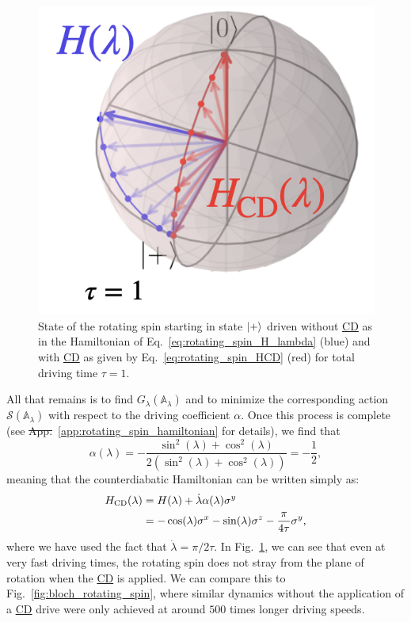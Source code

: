 \documentclass[a4paper,oneside,11pt]{book}
\newcommand{\sx}{\sigma^x}
\newcommand{\sy}{\sigma^y}
\newcommand{\sz}{\sigma^z}
\newcommand{\dotlambda}{\dot{\lambda}}
\newcommand{\approxAGP}{\mathbb{A}_{\lambda}}
\newcommand{\HCD}{H_{\rm CD}}
\newcommand{\acrref}[1]{\hyperref[acr:#1]{#1}}
\providecommand{\DIFaddtex}[1]{{\protect\color{blue}\uwave{#1}}} %
\providecommand{\DIFdeltex}[1]{{\protect\color{red}\sout{#1}}}                      %
\providecommand{\DIFaddbegin}{} %
\providecommand{\DIFaddend}{} %
\providecommand{\DIFdelbegin}{} %
\providecommand{\DIFdelend}{} %
\providecommand{\DIFadd}[1]{\texorpdfstring{\DIFaddtex{#1}}{#1}} %
\providecommand{\DIFdel}[1]{\texorpdfstring{\DIFdeltex{#1}}{}} %
\newcommand{\DIFscaledelfig}{0.5}
\newlength{\DIFdelgraphicswidth} %
\newlength{\DIFdelgraphicsheight} %
\newcommand{\DIFaddincludegraphics}[2][]{{\color{blue}\fbox{\DIFOincludegraphics[#1]{#2}}}} %
\newcommand{\DIFdelincludegraphics}[2][]{%
\sbox{\DIFdelgraphicsbox}{\DIFOincludegraphics[#1]{#2}}%
\settoboxwidth{\DIFdelgraphicswidth}{\DIFdelgraphicsbox} %
\settoboxtotalheight{\DIFdelgraphicsheight}{\DIFdelgraphicsbox} %
\scalebox{\DIFscaledelfig}{%
\parbox[b]{\DIFdelgraphicswidth}{\usebox{\DIFdelgraphicsbox}\\[-\baselineskip] \rule{\DIFdelgraphicswidth}{0em}}\llap{\resizebox{\DIFdelgraphicswidth}{\DIFdelgraphicsheight}{%
\setlength{\unitlength}{\DIFdelgraphicswidth}%
\begin{picture}(1,1)%
\thicklines\linethickness{2pt} %
{\color[rgb]{1,0,0}\put(0,0){\framebox(1,1){}}}%
{\color[rgb]{1,0,0}\put(0,0){\line( 1,1){1}}}%
{\color[rgb]{1,0,0}\put(0,1){\line(1,-1){1}}}%
\end{picture}%
}\hspace*{3pt}}} %
} %
\DeclareRobustCommand{\DIFaddbegin}{\DIFOaddbegin \let\includegraphics\DIFaddincludegraphics} %
\DeclareRobustCommand{\DIFaddend}{\DIFOaddend \let\includegraphics\DIFOincludegraphics} %
\DeclareRobustCommand{\DIFdelbegin}{\DIFOdelbegin \let\includegraphics\DIFdelincludegraphics} %
\DeclareRobustCommand{\DIFdelend}{\DIFOaddend \let\includegraphics\DIFOincludegraphics} %
\begin{document}
    \begin{figure}
    \centering
    \includegraphics[width=0.9\linewidth]{images/rotating_spin_CD.png} \caption[Rotating spin Bloch sphere illustration with counterdiabatic driving]{State of the rotating spin starting in state $\ket{+}$ driven without \acrref{CD} as in the Hamiltonian of Eq.~\eqref{eq:rotating_spin_H_lambda} (blue) and with \acrref{CD} as given by Eq.~\eqref{eq:rotating_spin_HCD} (red) for total driving time $\tau = 1$.}\label{fig:rotating_CD}
    \end{figure}

    All that remains is to find $G_{\lambda}(\approxAGP)$ and to minimize the corresponding action $\mathcal{S}(\approxAGP)$ with respect to the driving coefficient $\alpha$. Once this process is complete (see \DIFdelbegin \DIFdel{App.}\DIFdelend \DIFaddbegin \DIFadd{Appendix}\DIFaddend ~\ref{app:rotating_spin_hamiltonian} for details), we find that
    \begin{equation}\label{eq:rotating_spin_alpha}
        \alpha(\lambda) = -\frac{\sin^2(\lambda) + \cos^2(\lambda)}{2(\sin^2(\lambda) + \cos^2(\lambda))} = - \frac{1}{2},
    \end{equation}
    meaning that the counterdiabatic Hamiltonian can be written simply as:
    \begin{equation}\label{eq:rotating_spin_HCD}
        \begin{aligned}
            \HCD(\lambda) &= H(\lambda) + \dotlambda \alpha(\lambda) \sy \\
            &= -\cos(\lambda)\sx - \sin(\lambda)\sz - \frac{\pi}{4 \tau} \sy,
        \end{aligned}
    \end{equation}
    where we have used the fact that $\dotlambda = \pi/2\tau$. In Fig.~\ref{fig:rotating_CD}, we can see that even at very fast driving times, the rotating spin does not stray from the plane of rotation when the \acrref{CD} is applied. We can compare this to Fig.~\ref{fig:bloch_rotating_spin}, where similar dynamics without the application of a \acrref{CD} drive were only achieved at around $500$ times longer driving speeds.
\end{document}

